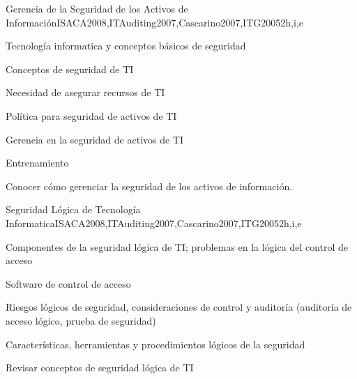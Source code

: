 \begin{syllabus}
    \begin{unit}{Gerencia de la Seguridad de los Activos de Información}{}{ISACA2008,ITAuditing2007,Cascarino2007,ITG2005}{2}{h,i,e}
    \begin{topics}
    \item Tecnología informatica y conceptos básicos de seguridad
    \item Conceptos de seguridad de TI 
    \item Necesidad de asegurar recursos de TI
    \item Política para seguridad de activos de TI 
    \item Gerencia en la seguridad de activos de TI 
    \item Entrenamiento
    \end{topics}
    
    \begin{learningoutcomes}
    \item Conocer cómo gerenciar la seguridad de los activos de información.
    \end{learningoutcomes}
    \end{unit}
    
    \begin{unit}{Seguridad Lógica de Tecnología Informatica}{}{ISACA2008,ITAuditing2007,Cascarino2007,ITG2005}{2}{h,i,e}
    \begin{topics}
    \item Componentes de la seguridad lógica de TI; problemas en la lógica del control de acceso
    \item Software de control de acceso
    \item Riesgos lógicos de seguridad, consideraciones de control y auditoría (auditoría de acceso lógico, prueba de seguridad)
    \item Características, herramientas y procedimientos lógicos de la seguridad
    \end{topics}
    
    \begin{learningoutcomes}
    \item Revisar conceptos de seguridad lógica de TI
    \end{learningoutcomes}
    \end{unit}
    

\end{syllabus}
